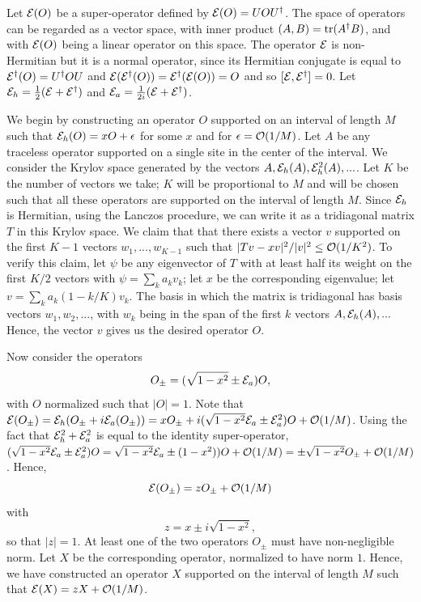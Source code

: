 \documentclass[twocolumn,superscriptaddress, prb]{revtex4-1}
\newcommand{\be}{\begin{equation}}
\newcommand{\ee}{\end{equation}}
\begin{document}
Let ${\cal E}(O)$ be a super-operator defined by ${\cal E}(O)=UOU^\dagger$.  The space of operators can be regarded as a vector space, with inner product $(A,B)={\rm tr}(A^\dagger B)$, and with ${\cal E}(O)$ being a linear operator on this space.  The operator ${\cal E}$ is non-Hermitian but it is a normal operator, since its Hermitian conjugate is equal to ${\cal E}^\dagger(O)=U^\dagger O U$ and ${\cal E}({\cal E}^\dagger(O))={\cal E}^\dagger({\cal E}(O))=O$ and so $[{\cal E},{\cal E}^\dagger]=0$.
Let ${\cal E}_h=\frac{1}{2}({\cal E}+{\cal E}^\dagger)$ and ${\cal E}_a=\frac{1}{2i}({\cal E}+{\cal E}^\dagger)$.

We begin by constructing an operator $O$ supported on an interval of length $M$ such that ${\cal E}_h(O)= x O+\epsilon$ for some $x$ and for $\epsilon={\cal O}(1/M)$.  Let $A$ be any traceless operator supported on a single site in the center of the interval.  We consider the Krylov space generated by the vectors $A, {\cal E}_h(A), {\cal E}_h^2(A),...$.  Let $K$ be the number of vectors we take; $K$ will be proportional to $M$ and will be chosen such that all these operators are supported on the interval of length $M$.
Since ${\cal E}_h$ is Hermitian, using the Lanczos procedure, we can write it as a tridiagonal matrix $T$ in this Krylov space.   We claim that that there exists a vector $v$ supported on the first $K-1$ vectors $w_1,...,w_{K-1}$ such that $|Tv-xv|^2/|v|^2\leq {\cal O}(1/K^2)$.  To verify this claim, let $\psi$ be any eigenvector of $T$ with at least half its weight on the first $K/2$ vectors with $\psi=\sum_k a_k v_k$; let $x$ be the corresponding eigenvalue; let $v=\sum_k a_k (1-k/K) v_k$.
The basis in which the matrix is tridiagonal has basis vectors $w_1,w_2,...$, with $w_k$ being in the span of the first $k$ vectors $A, {\cal E}_h(A),...$
Hence, the vector $v$ gives us the desired operator $O$.

Now consider the operators
\be
O_{\pm}=(\sqrt{1-x^2} \pm {\cal E}_a) O,
\ee
with $O$ normalized such that $|O|=1$.
Note that ${\cal E}(O_{\pm})={\cal E}_h(O_{\pm}+i {\cal E}_a(O_{\pm}))=xO_{\pm}+i(\sqrt{1-x^2}{\cal E}_a \pm {\cal E}_a^2) O + {\cal O}(1/M)$.  Using
the fact that ${\cal E}_h^2+{\cal E}_a^2$ is equal to the identity super-operator, $(\sqrt{1-x^2}{\cal E}_a \pm {\cal E}_a^2) O=\sqrt{1-x^2}{\cal E}_a \pm (1-x^2) ) O +{\cal O}(1/M)=\pm\sqrt{1-x^2}O_{\pm}+{\cal O}(1/M)$.
Hence,
\be
{\cal E}(O_{\pm})=z O_{\pm}+{\cal O}(1/M)
\ee
with
\be
z=x\pm i \sqrt{1-x^2},
\ee
so that $|z|=1$.
At least one of the two operators $O_{\pm}$ must have non-negligible norm.  Let $X$ be the corresponding operator, normalized to have norm $1$.  Hence, we have constructed an operator $X$ supported on the interval of length $M$ such that ${\cal E}(X)=z X + {\cal O}(1/M)$.
\end{document}
